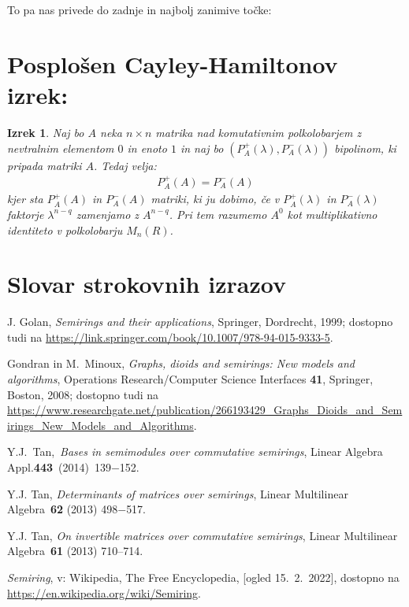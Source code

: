 \documentclass[mat1]{fmfdelo}
\newtheorem{izr}{Izrek}
\begin{document}
To pa nas privede do zadnje in najbolj zanimive točke:

\section{Posplošen Cayley-Hamiltonov izrek:}

\begin{izr}
	Naj bo $A$ neka $n\times n$ matrika nad komutativnim polkolobarjem z nevtralnim elementom $0$ in enoto $1$ in naj bo $(P^{+}_A(\lambda), P^{-}_A(\lambda))$ bipolinom, ki pripada matriki $A$. Tedaj velja: \begin{align}
		P^{+}_A(A) = P^{-}_A(A)
	\end{align}
	kjer sta $P^{+}_A(A)$ in $P^{-}_A(A)$ matriki, ki ju dobimo, če v $P^{+}_A(\lambda)$ in $P^{-}_A(\lambda)$ faktorje $\lambda^{n-q}$ zamenjamo z $A^{n-q}$. Pri tem razumemo $A^0$ kot multiplikativno identiteto v polkolobarju $M_n(R)$.
\end{izr}

\section*{Slovar strokovnih izrazov}


\begin{thebibliography}{99}
	
	 J. Golan, \emph{Semirings and their applications}, Springer, Dordrecht, 1999; dostopno tudi na \url{https://link.springer.com/book/10.1007/978-94-015-9333-5}. 
	
	 Gondran in M.~Minoux, \emph{Graphs, dioids and semirings: New models and algorithms}, Operations Research/Computer Science Interfaces \textbf{41}, Springer, Boston, 2008; dostopno tudi na \url{https://www.researchgate.net/publication/266193429_Graphs_Dioids_and_Semirings_New_Models_and_Algorithms}.
	
	 Y.J.~Tan,~\emph{Bases in semimodules over commutative semirings}, Linear Algebra Appl.\~\textbf{443}~(2014)~139$-$152.
	
	 Y.J. Tan, \emph{Determinants of matrices over semirings}, Linear Multilinear Algebra~\textbf{62} (2013) 498$-$517.
	
	 Y.J. Tan, \emph{On invertible matrices over commutative semirings}, Linear Multilinear Algebra~\textbf{61} (2013) 710$–$714.
	
	
	 \emph{Semiring}, v: Wikipedia, The Free Encyclopedia, [ogled 15.~2.~2022], dostopno na \url{https://en.wikipedia.org/wiki/Semiring}.
	
\end{thebibliography}
\end{document}
